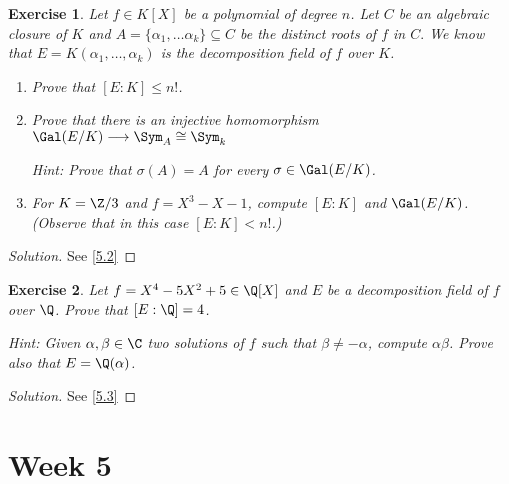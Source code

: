 \documentclass[a4paper,10pt,reqno]{amsart}
\newtheorem{ex}{Exercise}[section]
\newenvironment{sol}
  {\renewcommand\qedsymbol{$\blacksquare$}\begin{proof}[Solution]}
  {\end{proof}}
\begin{document}
\begin{ex}
\label{4.4}
    Let $f\in K[X]$ be a polynomial of degree $n$.
    Let $C$ be an algebraic closure of $K$ and $A=\{\alpha_1,\dots\alpha_k\}\subseteq C$ be the distinct roots of $f$ in $C.$
    We know that $E=K(\alpha_1,\dots,\alpha_k)$ is the decomposition field of $f$ over $K$.
    \begin{enumerate}[label=(\roman*)]
    \item Prove that $[E:K]\leq n! $.
    \item Prove that there is an injective homomorphism $\Gal(E/K)\longrightarrow \Sym_{A}\cong \Sym_k$ 
    
    \noindent\textit{Hint: } Prove that $\sigma(A)=A$ for every $\sigma \in \Gal(E/K)$.
    \item For $K=\Z/3$ and $f=X^3-X-1$, compute $[E:K]$ and $\Gal(E/K)$.
    (Observe that in this case $[E:K]<n!$.)
    \end{enumerate}
\end{ex}
\begin{sol}
    See \cref{5.2}
\end{sol}



\begin{ex}
\label{4.5}
    Let $f=X^4-5X^2+5\in \Q[X]$ and $E$ be a decomposition field of $f$ over $\Q$. 
    Prove that $[E:\Q]=4$. 

    \textit{Hint:}
    Given $\alpha,\beta\in \C$
    two solutions of $f$ such that $\beta\neq-\alpha$,
    compute $\alpha\beta$.
    Prove also that $E=\Q(\alpha)$.
\end{ex}
\begin{sol}
    See \cref{5.3}
\end{sol}



\newpage

\section{Week 5}
\end{document}
